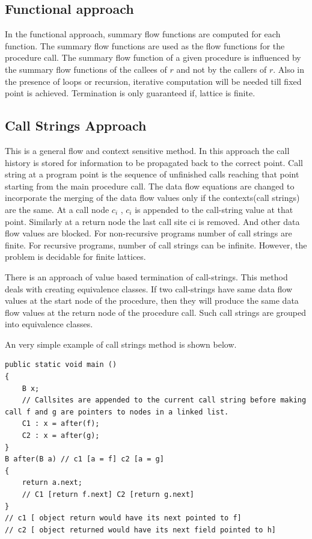 \subsection{Functional approach}

In the functional approach, summary flow functions are computed for each function. The summary flow functions are used as the flow functions for the procedure call. The summary flow function of a given procedure is influenced by the summary flow functions of the callees of $r$ and not by the callers of $r$. Also in the presence of loops or recursion, iterative computation will be needed till fixed point is achieved. Termination is only guaranteed if, lattice is finite.

\subsection{Call Strings Approach}

This is a general flow and context sensitive method. In this approach the call history is stored for information to be propagated back to the correct point. Call string at a program point is the sequence of unfinished calls reaching that point starting from the main procedure call. The data flow equations are changed to incorporate the merging of the data flow values only if the contexts(call strings) are the same. At a call node $c_i$ , $c_i$ is appended to the call-string value at that point. Similarly at a return node the last call site ci is removed. And other data flow values are blocked. For non-recursive programs number of call strings are finite. For recursive programs, number of call strings can be infinite. However, the problem is decidable for finite lattices.

There is an approach of value based termination of call-strings. This method deals with creating equivalence classes. If two call-strings have same data flow values at the start node of the procedure, then they will produce the same data flow values at the return node of the procedure call. Such call strings are grouped into equivalence classes.

An very simple example of call strings method is shown below.\cite{mtpreport}
\begin{verbatim}
public static void main ()
{
	B x;
	// Callsites are appended to the current call string before making call f and g are pointers to nodes in a linked list.
	C1 : x = after(f); 
	C2 : x = after(g);
}
B after(B a) // c1 [a = f] c2 [a = g]
{
	return a.next;
	// C1 [return f.next] C2 [return g.next]
}
// c1 [ object return would have its next pointed to f] 
// c2 [ object returned would have its next field pointed to h]

\end{verbatim}


